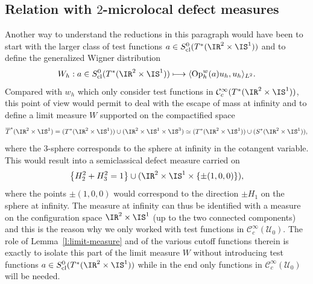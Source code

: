\documentclass[10pt]{amsart}
\newcommand\mto{\mathchoice{\longmapsto}{\mapsto}{\mapsto}{\mapsto}}
\theoremstyle{plain}
\theoremstyle{definition}
\theoremstyle{remark}
\newcommand{\Op}{\operatorname{Op}}
\begin{document}
\subsection{Relation with $2$-microlocal defect measures}\label{ss:2microlocal}
Another way to understand the reductions in this paragraph would have been to start with the larger class of test functions $a\in S^0_{\textup{cl}}(T^*(\IR^2\times \IS^1))$ and to define the generalized Wigner distribution
\[
W_h: a\in S^0_{\textup{cl}}(T^*(\IR^2\times \IS^1))\mto \langle \Op_h^w(a)u_h,u_h\rangle_{L^2}.
\]
Compared with $w_h$ which only consider test functions in $\mathcal{C}^{\infty}_c(T^*(\IR^2\times \IS^1))$, this point of view would permit to deal with the escape of mass at infinity and to define a limit measure $W$ supported on the compactified space
\[
\overline{T}^*(\IR^2\times \IS^1)=(T^*(\IR^2\times \IS^1))\cup(\IR^2\times \IS^1\times\IS^3)\simeq (T^*(\IR^2\times \IS^1))\cup(S^*(\IR^2\times \IS^1)),
\]
where the $3$-sphere corresponds to the sphere at infinity in the cotangent variable. This would result into a semiclassical defect measure carried on
\[
\left\{H_2^2+H_3^2=1\right\}\cup (\IR^2\times\IS^1\times \{\pm (1,0,0)\}),
\]
where the points $\pm (1,0,0)$ would correspond to the direction $\pm H_1$ on the sphere at infinity. The measure at infinity can thus be identified with a measure on the configuration space $\IR^2\times\IS^1$ (up to the two connected components) and this is the reason why we only worked with test functions in $\mathcal{C}^{\infty}_c(\mathcal{U}_0)$. The role of Lemma~\ref{l:limit-measure} and of the various cutoff functions therein is exactly to isolate this part of the limit measure $W$ without introducing test functions $a\in S^0_{\textup{cl}}(T^*(\IR^2\times \IS^1))$ while in the end only functions in $\mathcal{C}^{\infty}_c(\mathcal{U}_0)$ will be needed.
\end{document}
